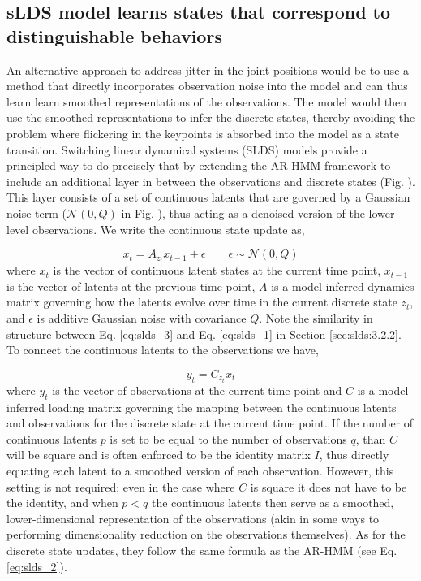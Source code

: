 \subsection{sLDS model learns states that correspond to distinguishable behaviors}
\label{sec:slds:3.2.3}
An alternative approach to address jitter in the joint positions would be to use a method that directly incorporates observation noise into the model and can thus learn learn smoothed representations of the observations. The model would then use the smoothed representations to infer the discrete states, thereby avoiding the problem where flickering in the keypoints is absorbed into the model as a state transition. Switching linear dynamical systems (SLDS) models provide a principled way to do precisely that by extending the AR-HMM framework to include an additional layer in between the observations and discrete states (Fig. ). This layer consists of a set of continuous latents that are governed by a Gaussian noise term ($\mathcal{N}(0,Q)$ in Fig. ), thus acting as a denoised version of the lower-level observations. We write the continuous state update as, 

\begin{equation} \label{eq:slds_3}
x_t = A_{z_t} x_{t-1} + \epsilon \qquad \epsilon \sim \mathcal{N}(0,Q)
\end{equation}
where $x_t$ is the vector of continuous latent states at the current time point, $x_{t-1}$ is the vector of latents at the previous time point, $A$ is a model-inferred dynamics matrix governing how the latents evolve over time in the current discrete state $z_t$, and $\epsilon$ is additive Gaussian noise with covariance $Q$. Note the similarity in structure between Eq. \ref{eq:slds_3} and Eq. \ref{eq:slds_1} in Section \ref{sec:slds:3.2.2}. To connect the continuous latents to the observations we have, 

\begin{equation} \label{eq:slds_4}
y_t = C_{z_t}x_{t} 
\end{equation}
where $y_t$ is the vector of observations at the current time point and $C$ is a model-inferred loading matrix governing the mapping between the continuous latents and observations for the discrete state at the current time point. If the number of continuous latents $p$ is set to be equal to the number of observations $q$, than $C$ will be square and is often enforced to be the identity matrix $I$, thus directly equating each latent to a smoothed version of each observation. However, this setting is not required; even in the case where $C$ is square it does not have to be the identity, and when $p<q$ the continuous latents then serve as a smoothed, lower-dimensional representation of the observations (akin in some ways to performing dimensionality reduction on the observations themselves). As for the discrete state updates, they follow the same formula as the AR-HMM (see Eq. \ref{eq:slds_2}). 

